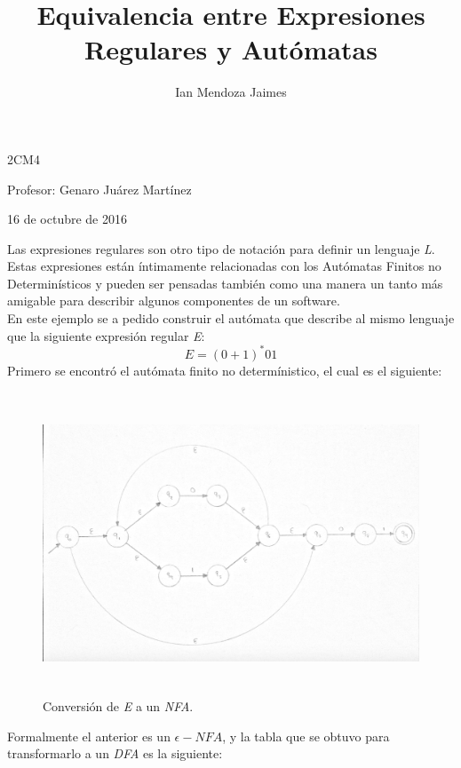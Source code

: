 \documentclass[12pt]{article}
\title{Equivalencia entre Expresiones Regulares y Autómatas}
\author{Ian Mendoza Jaimes}
\date{}
\begin{document}
\maketitle
\begin{center}
2CM4

Profesor: Genaro Juárez Martínez

16 de octubre de 2016
\end{center}

\vspace{3em}

Las expresiones regulares son otro tipo de notación para definir un lenguaje \textit{L}. Estas expresiones están íntimamente relacionadas con los Autómatas Finitos no Determinísticos y pueden ser pensadas también como una manera un tanto más amigable para describir algunos componentes de un software. \\

En este ejemplo se a pedido construir el autómata que describe al mismo lenguaje que la siguiente expresión regular \textit{E}: 
\[E=(0+1)^{*}01\]
Primero se encontró el autómata finito no determínistico, el cual es el siguiente:

\begin{figure}[H]
\includegraphics[width=\textwidth, height=9cm]{nfa}
\caption{Conversión de \textit{E} a un \textit{NFA}.}
\end{figure}

Formalmente el anterior es un $\epsilon-NFA$, y la tabla que se obtuvo para transformarlo a un \textit{DFA} es la siguiente: \\
\end{document}
